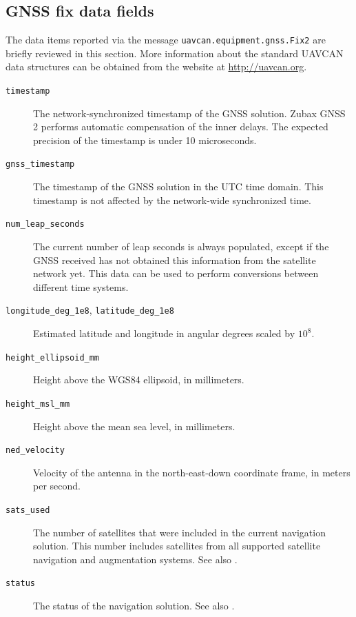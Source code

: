 \documentclass{zubaxdoc}
\begin{document}
\subsection{GNSS fix data fields}

The data items reported via the message \verb|uavcan.equipment.gnss.Fix2| are briefly reviewed in this section.
More information about the standard UAVCAN data structures can be obtained from the website at
\url{http://uavcan.org}.

\begin{description}
    \item[\texttt{timestamp}] The network-synchronized timestamp of the GNSS solution.
    Zubax GNSS 2 performs automatic compensation of the inner delays.
    The expected precision of the timestamp is under 10 microseconds.

    \item[\texttt{gnss\_timestamp}] The timestamp of the GNSS solution in the UTC time domain.
    This timestamp is not affected by the network-wide synchronized time.

    \item[\texttt{num\_leap\_seconds}] The current number of leap seconds is always populated,
    except if the GNSS received has not obtained this information from the satellite network yet.
    This data can be used to perform conversions between different time systems.

    \item[\texttt{longitude\_deg\_1e8}, \texttt{latitude\_deg\_1e8}] Estimated latitude and longitude
    in angular degrees scaled by $10^8$.

    \item[\texttt{height\_ellipsoid\_mm}] Height above the WGS84 ellipsoid, in millimeters.

    \item[\texttt{height\_msl\_mm}] Height above the mean sea level, in millimeters.

    \item[\texttt{ned\_velocity}] Velocity of the antenna in the north-east-down coordinate frame,
    in meters per second.
    
    \item[\texttt{sats\_used}] The number of satellites that were included in the current navigation solution.
    This number includes satellites from all supported satellite navigation and augmentation systems.
    See also .
    
    \item[\texttt{status}] The status of the navigation solution.
    See also .
    

\end{description}
\end{document}
